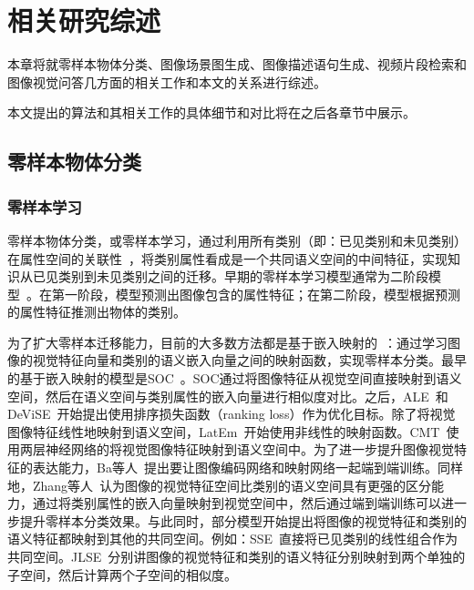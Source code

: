 \chapter{相关研究综述}

本章将就零样本物体分类、图像场景图生成、图像描述语句生成、视频片段检索和图像视觉问答几方面的相关工作和本文的关系进行综述。

本文提出的算法和其相关工作的具体细节和对比将在之后各章节中展示。


\section{零样本物体分类}

\subsection{零样本学习}
零样本物体分类，或零样本学习，通过利用所有类别（即：已见类别和未见类别）在属性空间的关联性~\cite{farhadi2009describing,lampert2009learning,romera2015embarrassingly,norouzi2014zero,demirel2017attributes2classname,jiang2017learning}，将类别属性看成是一个共同语义空间的中间特征，实现知识从已见类别到未见类别之间的迁移。早期的零样本学习模型通常为二阶段模型~\cite{lampert2013attribute,norouzi2014zero,al2016recovering,jayaraman2014zero,kankuekul2012online}。在第一阶段，模型预测出图像包含的属性特征；在第二阶段，模型根据预测的属性特征推测出物体的类别。

为了扩大零样本迁移能力，目前的大多数方法都是基于嵌入映射的~\cite{palatucci2009zero,frome2013devise,akata2015label,akata2015evaluation,romera2015embarrassingly,xian2016latent,socher2013zero,kodirov2017semantic,li2017zero}：通过学习图像的视觉特征向量和类别的语义嵌入向量之间的映射函数，实现零样本分类。最早的基于嵌入映射的模型是SOC~\cite{palatucci2009zero}。SOC通过将图像特征从视觉空间直接映射到语义空间，然后在语义空间与类别属性的嵌入向量进行相似度对比。之后，ALE~\cite{akata2015label}和DeViSE~\cite{frome2013devise}开始提出使用排序损失函数（ranking loss）作为优化目标。除了将视觉图像特征线性地映射到语义空间，LatEm~\cite{xian2016latent}开始使用非线性的映射函数。CMT~\cite{socher2013zero}使用两层神经网络的将视觉图像特征映射到语义空间中。为了进一步提升图像视觉特征的表达能力，Ba等人~\cite{lei2015predicting}提出要让图像编码网络和映射网络一起端到端训练。同样地，Zhang等人~\cite{zhang2017learning}认为图像的视觉特征空间比类别的语义空间具有更强的区分能力，通过将类别属性的嵌入向量映射到视觉空间中，然后通过端到端训练可以进一步提升零样本分类效果。与此同时，部分模型开始提出将图像的视觉特征和类别的语义特征都映射到其他的共同空间。例如：SSE~\cite{zhang2015zero}直接将已见类别的线性组合作为共同空间。JLSE~\cite{zhang2016zero}分别讲图像的视觉特征和类别的语义特征分别映射到两个单独的子空间，然后计算两个子空间的相似度。

